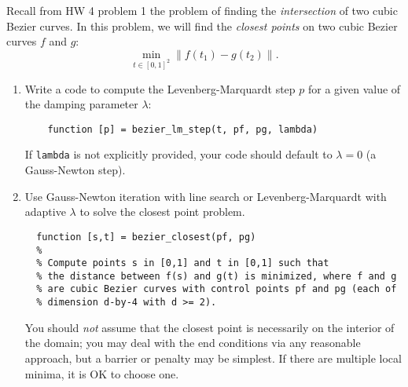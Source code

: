 \documentclass[12pt, leqno]{article}
\begin{document}

Recall from HW 4 problem 1 the problem of finding the {\em intersection}
of two cubic Bezier curves.  In this problem, we will find the
{\em closest points} on two cubic Bezier curves $f$ and $g$:
\[
  \min_{t \in [0,1]^2} \|f(t_1)-g(t_2)\|.
\]
\begin{enumerate}
\item
  Write a code to compute the Levenberg-Marquardt step $p$ for a
  given value of the damping parameter $\lambda$:
  \begin{lstlisting}
    function [p] = bezier_lm_step(t, pf, pg, lambda)
  \end{lstlisting}
  If {\tt lambda} is not explicitly provided, your code should default
  to $\lambda = 0$ (a Gauss-Newton step).
\item
  Use Gauss-Newton iteration with line search or Levenberg-Marquardt
  with adaptive $\lambda$ to solve the closest point problem.
\begin{lstlisting}
  function [s,t] = bezier_closest(pf, pg)
  %
  % Compute points s in [0,1] and t in [0,1] such that
  % the distance between f(s) and g(t) is minimized, where f and g
  % are cubic Bezier curves with control points pf and pg (each of
  % dimension d-by-4 with d >= 2).
\end{lstlisting}
  You should {\em not} assume that the closest point is necessarily
  on the interior of the domain; you may deal with the end conditions
  via any reasonable approach, but a barrier or penalty may be
  simplest.  If there are multiple local minima, it is OK to choose one.
\end{enumerate}
\end{document}
